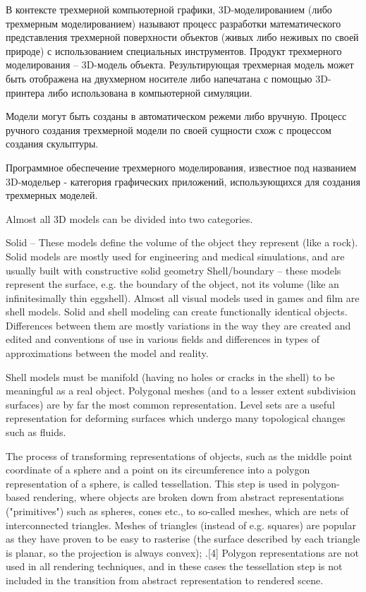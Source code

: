 В контексте трехмерной компьютерной графики, 3D-моделированием (либо трехмерным моделированием) называют процесс разработки
математического представления трехмерной поверхности объектов (живых либо неживых по своей природе) с использованием специальных
инструментов. Продукт трехмерного моделирования -- 3D-модель объекта. Результирующая трехмерная модель может быть отображена
на двухмерном носителе либо напечатана с помощью 3D-принтера либо использована в компьютерной симуляции.

Модели могут быть созданы в автоматическом режеми либо вручную. Процесс ручного создания трехмерной модели по своей сущности
схож с процессом создания скульптуры.

Программное обеспечение трехмерного моделирования, известное под названием 3D-модельер - категория графических приложений, использующихся для создания трехмерных
моделей.

Almost all 3D models can be divided into two categories.

Solid – These models define the volume of the object they represent (like a rock). Solid models are mostly used for engineering
and medical simulations, and are usually built with constructive solid geometry
Shell/boundary – these models represent the surface, e.g. the boundary of the object, not its volume
(like an infinitesimally
thin eggshell). Almost all visual models used in games and film are shell models.
Solid and shell modeling can create functionally identical objects. Differences between them are mostly variations in the way
they are created and edited and conventions of use in various fields and differences in types of approximations between the
model and reality.

Shell models must be manifold (having no holes or cracks in the shell) to be meaningful as a real object. Polygonal meshes
(and to a lesser extent subdivision surfaces) are by far the most common representation. Level sets are a useful representation
for deforming surfaces which undergo many topological changes such as fluids.

The process of transforming representations of objects, such as the middle point coordinate of a sphere and a point on its
circumference into a polygon representation of a sphere, is called tessellation. This step is used in polygon-based rendering,
where objects are broken down from abstract representations ("primitives") such as spheres, cones etc., to so-called meshes,
which are nets of interconnected triangles. Meshes of triangles (instead of e.g. squares) are popular as they have proven to
be easy to rasterise (the surface described by each triangle is planar, so the projection is always convex); .[4] Polygon 
representations are not used in all rendering techniques, and in these cases the tessellation step is not included in the
transition from abstract representation to rendered scene.

